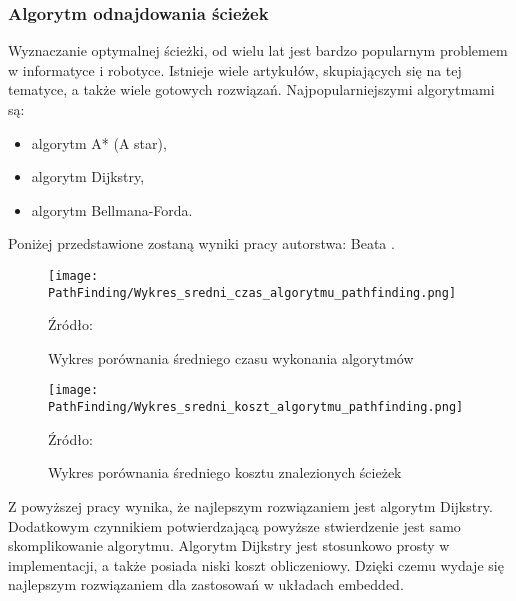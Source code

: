         \subsubsection{Algorytm odnajdowania ścieżek}
        \label{subsec:algorytm_odnajdowania_ścieżek}
            Wyznaczanie optymalnej ścieżki, od wielu lat jest bardzo popularnym problemem w informatyce i robotyce.
            Istnieje wiele artykułów, skupiających się na tej tematyce, a także wiele gotowych rozwiązań.
            Najpopularniejszymi algorytmami są:
            \begin{itemize}
                \item algorytm A* (A star),
                \item algorytm Dijkstry,
                \item algorytm Bellmana-Forda.
            \end{itemize}

            Poniżej przedstawione zostaną wyniki pracy  \cite{AnalizaAlgorytmówŚcieżek}
            autorstwa: Beata \citeauthor{AnalizaAlgorytmówŚcieżek}.
            \begin{figure}[!ht]
                \centering
                \texttt{[image: PathFinding/Wykres\_sredni\_czas\_algorytmu\_pathfinding.png]}
                \caption{Wykres porównania średniego czasu wykonania algorytmów}
                Źródło:\cite{AnalizaAlgorytmówŚcieżek} 
                \label{fig:PathFindingTime}
            \end{figure}
            \begin{figure}[!ht]
                \centering
                \texttt{[image: PathFinding/Wykres\_sredni\_koszt\_algorytmu\_pathfinding.png]}
                \caption{Wykres porównania średniego kosztu znalezionych ścieżek}
                Źródło:\cite{AnalizaAlgorytmówŚcieżek} 
                \label{fig:PathFindingCost}
            \end{figure}

            Z powyższej pracy wynika, że najlepszym rozwiązaniem jest algorytm Dijkstry.
            Dodatkowym czynnikiem potwierdzającą powyższe stwierdzenie jest samo skomplikowanie algorytmu.
            Algorytm Dijkstry jest stosunkowo prosty w implementacji, a także posiada niski koszt obliczeniowy.
            Dzięki czemu wydaje się najlepszym rozwiązaniem dla zastosowań w układach embedded.


